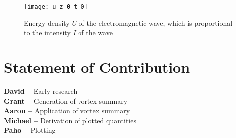 \documentclass[10pt]{article}
\begin{document}
\begin{figure}[h]
\centering
\texttt{[image: u-z-0-t-0]}
\caption{Energy density $U$ of the electromagnetic wave, which is proportional to the intensity $I$ of the wave}
\label{g:F}
\end{figure}



\section*{Statement of Contribution}
\textbf{David --} Early research \\
\textbf{Grant --} Generation of vortex summary \\
\textbf{Aaron --} Application of vortex summary \\
\textbf{Michael --} Derivation of plotted quantities \\
\textbf{Paho --} Plotting\\

 

\end{document}

